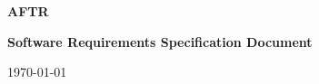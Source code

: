 
\begin{titlepage}
\begin{center}
  
  \vspace{1.5in}
  
  {\Large\bf AFTR}
  
  \vspace{0.5in}
  
  {\large\bf Software Requirements Specification Document}
  
  \vspace{0.5in}
  
  \today
  
\end{center}
\end{titlepage}
